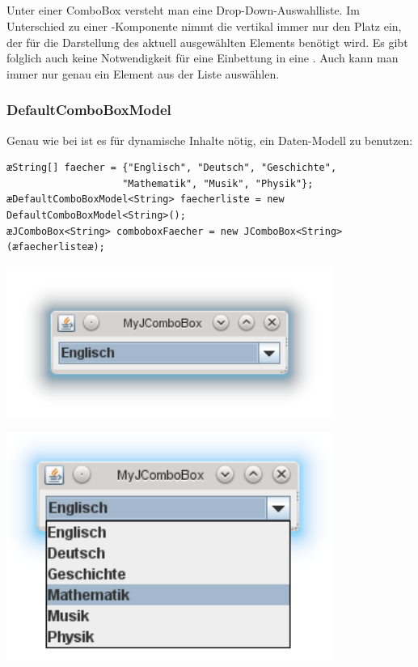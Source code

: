 \subsection{}

Unter einer ComboBox versteht man eine Drop-Down-Auswahlliste. Im Unterschied
zu einer -Komponente nimmt die  vertikal immer
nur den Platz ein, der für die Darstellung des aktuell ausgewählten Elements
benötigt wird. Es gibt folglich auch keine Notwendigkeit für eine Einbettung in
eine . Auch kann man immer nur genau ein Element aus der
Liste auswählen.

\subsubsection{DefaultComboBoxModel}

Genau wie bei  ist es für dynamische Inhalte nötig, ein
Daten-Modell zu benutzen:

\begin{lstlisting}
æString[] faecher = {"Englisch", "Deutsch", "Geschichte", 
                    "Mathematik", "Musik", "Physik"};
æDefaultComboBoxModel<String> faecherliste = new DefaultComboBoxModel<String>();
æJComboBox<String> comboboxFaecher = new JComboBox<String>(æfaecherlisteæ);
\end{lstlisting}

\begin{minipage}{0.5\textwidth}
\includegraphics[width=0.8\textwidth]{./inf/SEKII/24_Java_GUI-Komponenten/JComboBox.png}
\end{minipage}
\begin{minipage}{0.5\textwidth}
\includegraphics[width=0.8\textwidth]{./inf/SEKII/24_Java_GUI-Komponenten/JComboBox_ausgeklappt.png}
\end{minipage}

